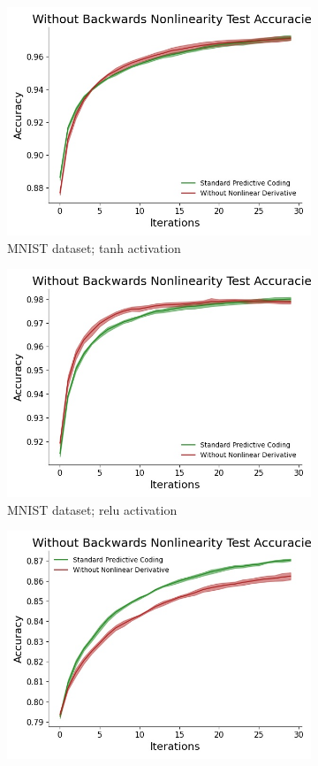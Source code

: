 \begin{figure}[ht] 
  \begin{subfigure}[b]{0.5\linewidth}
    \centering
    \includegraphics[width=0.75\linewidth]{chapter_3_figures/mnist_tanh_Without_Backwards_Nonlinearity_Test_Accuracies_prelim_2.jpg} 
    \caption{\small MNIST dataset; tanh activation} 
    \vspace{4ex}
  \end{subfigure}%
  \begin{subfigure}[b]{0.5\linewidth}
    \centering
    \includegraphics[width=0.75\linewidth]{chapter_3_figures/mnist_relu_Without_Backwards_Nonlinearity_Test_Accuracies_prelim_2.jpg} 
    \caption{\small MNIST dataset; relu activation} 
    \vspace{4ex}
  \end{subfigure} 
  \begin{subfigure}[b]{0.5\linewidth}
    \centering
    \includegraphics[width=0.75\linewidth]{chapter_3_figures/fashion_tanh_Without_Backwards_Nonlinearity_Test_Accuracies_prelim_2.jpg} 

\end{subfigure}
\end{figure}
